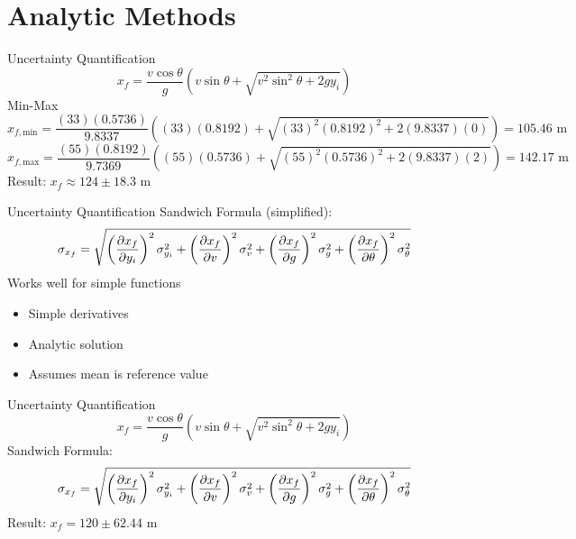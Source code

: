 \documentclass{beamer}
\begin{document}
\section{Analytic Methods}
\begin{frame}{Uncertainty Quantification}\vspace{-20pt}
\[x_f=\frac{v\cos{\theta}}{g}\left(v\sin\theta+\sqrt{v^2\sin^2\theta + 2gy_i}\right)\]
Min-Max
\tiny
\[x_{f,\text{min}}=\frac{(33)(0.5736)}{9.8337}\left((33)(0.8192)+\sqrt{(33)^2(0.8192)^2+2(9.8337)(0)}\right)= 105.46 \text{ m}\]
\[x_{f,\text{max}}=\frac{(55)(0.8192)}{9.7369}\left((55)(0.5736)+\sqrt{(55)^2(0.5736)^2+2(9.8337)(2)}\right)= 142.17 \text{ m}\]
\normalsize
Result: $x_f\approx124\pm18.3$ m \vspace{15pt}\\ \pause
{}
\end{frame}

\begin{frame}{Uncertainty Quantification}\vspace{-20pt}
Sandwich Formula (simplified):
\begin{equation*}
\sigma_{x_f} = \sqrt{\left(\pdv{x_f}{y_i}\right)^2\sigma_{y_i}^2 + \left(\pdv{x_f}{v}\right)^2\sigma_{v}^2 + \left(\pdv{x_f}{g}\right)^2\sigma_{g}^2 + \left(\pdv{x_f}{\theta}\right)^2\sigma_{\theta}^2}
\end{equation*}
Works well for simple functions
\begin{itemize}
\item Simple derivatives
\item Analytic solution
\item Assumes mean is reference value
\end{itemize}
\end{frame}

\begin{frame}{Uncertainty Quantification}\vspace{-30pt}
\begin{equation*}
x_f=\frac{v\cos{\theta}}{g}\left(v\sin\theta+\sqrt{v^2\sin^2\theta + 2gy_i}\right)
\end{equation*}%
Sandwich Formula:
\[\sigma_{x_f} = \sqrt{\left(\pdv{x_f}{y_i}\right)^2\sigma_{y_i}^2 + \left(\pdv{x_f}{v}\right)^2\sigma_{v}^2 + \left(\pdv{x_f}{g}\right)^2\sigma_{g}^2 + \left(\pdv{x_f}{\theta}\right)^2\sigma_{\theta}^2}\]%
Result: $x_f=120\pm62.44$ m  \vspace{10pt}\\
\end{frame}
\end{document}
